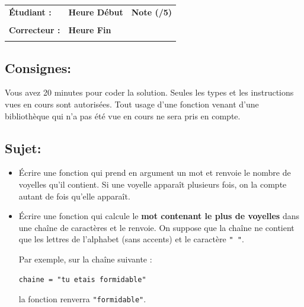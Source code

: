 \documentclass[a4paper,11pt]{article}
\begin{document}
\begin{table}[h!]
\centering
\renewcommand{\arraystretch}{1.4} %
\begin{tabular}{|p{10cm}|p{3cm}|p{2cm}|}
\hline
\textbf{Étudiant :} & \textbf{Heure Début }  & \textbf{Note (/5) }  \\
& & \\
\hline
\textbf{Correcteur :} & \textbf{Heure Fin } & \\
& & \\
\hline

\hline
\end{tabular}
\end{table}

\subsection*{Consignes:} Vous avez 20 minutes pour coder la solution. Seules les types et les instructions vues en cours sont autorisées. Tout usage d'une fonction 
venant d'une bibliothèque qui n'a pas été vue en cours ne sera pris en compte. 


\subsection*{Sujet:}

\begin{itemize}
\item[1.] \'Ecrire une fonction qui prend en argument un mot et renvoie le nombre de voyelles qu'il contient. Si une voyelle apparaît plusieurs fois, on la compte 
autant de fois qu'elle apparaît. 
    \item[2.] Écrire une fonction qui calcule le \textbf{mot contenant le plus de voyelles} dans une chaîne de caractères et le renvoie.
 On suppose que la chaîne ne contient que les lettres de l’alphabet (sans accents) et le caractère \texttt{" "}.

 \vspace*{0.2 cm}
 Par exemple, sur la chaîne suivante :
  
 
\begin{verbatim}
chaine = "tu etais formidable"
\end{verbatim}
    la fonction renverra \texttt{"formidable"}.



\end{itemize}
 \vspace*{0.2 cm}
\end{document}
